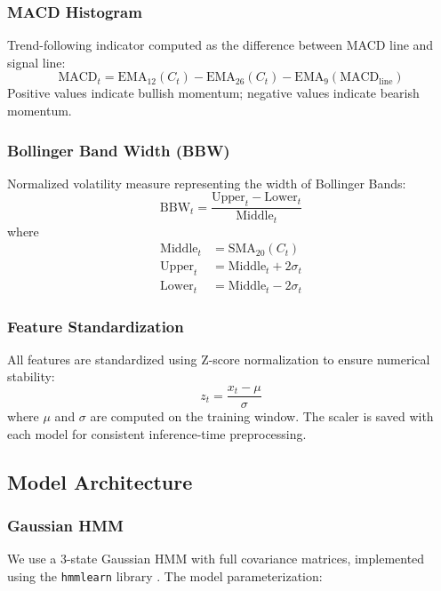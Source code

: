 \documentclass[conference]{IEEEtran}
\begin{document}
\subsubsection{MACD Histogram}
Trend-following indicator computed as the difference between MACD line and signal line:
\begin{equation}
\text{MACD}_t = \text{EMA}_{12}(C_t) - \text{EMA}_{26}(C_t) - \text{EMA}_{9}(\text{MACD}_{\text{line}})
\end{equation}
Positive values indicate bullish momentum; negative values indicate bearish momentum.

\subsubsection{Bollinger Band Width (BBW)}
Normalized volatility measure representing the width of Bollinger Bands:
\begin{equation}
\text{BBW}_t = \frac{\text{Upper}_t - \text{Lower}_t}{\text{Middle}_t}
\end{equation}
where
\begin{align}
\text{Middle}_t &= \text{SMA}_{20}(C_t) \\
\text{Upper}_t &= \text{Middle}_t + 2\sigma_t \\
\text{Lower}_t &= \text{Middle}_t - 2\sigma_t
\end{align}

\subsubsection{Feature Standardization}
All features are standardized using Z-score normalization to ensure numerical stability:
\begin{equation}
z_t = \frac{x_t - \mu}{\sigma}
\end{equation}
where $\mu$ and $\sigma$ are computed on the training window. The scaler is saved with each model for consistent inference-time preprocessing.

\subsection{Model Architecture}

\subsubsection{Gaussian HMM}
We use a 3-state Gaussian HMM with full covariance matrices, implemented using the \texttt{hmmlearn} library \cite{hmmlearn}. The model parameterization:
\end{document}
